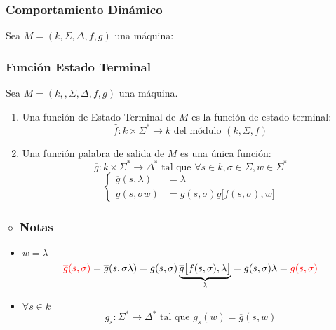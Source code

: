 \subsubsection{Comportamiento Dinámico}
Sea $M=(k,\Sigma,\Delta,f,g)$ una máquina: \\
\begin{center}
\end{center}
\subsubsection{Función Estado Terminal}
Sea $M=(k,,\Sigma,\Delta,f,g)$ una máquina.
\begin{enumerate}
\item Una función de Estado Terminal de $M$ es la función de estado terminal:
$$
\widehat{f}: k\times\Sigma^* \rightarrow k \text{ del módulo } (k,\Sigma,f)
$$
\item Una función palabra de salida de $M$ es una única función:
$$
\overline{g}:k\times\Sigma^*\rightarrow\Delta^* \text{ tal que }\forall s\in k,\sigma\in\Sigma, w\in\Sigma^*
$$
$$
\begin{cases}
\overline{g}(s,\lambda)&=\lambda \\
\overline{g}(s,\sigma w)&= g(s,\sigma)\overline{g} \big[ f(s,\sigma),w \big]
\end{cases}
$$
\end{enumerate}
\subsubsection{$\diamond$ Notas}
\begin{itemize}
\item $w=\lambda$
$$
{\color{red}\overline{g}(s,\sigma)}=
\overline{g}(s,\sigma\lambda)=
g(s,\sigma)\underbrace{\overline{g} \big[ f(s,\sigma),\lambda \big]}_{\lambda}=g(s,\sigma)\lambda =
{\color{red}g(s,\sigma)}
$$
\item $\forall s\in k$
$$
g_s:\Sigma^*\rightarrow\Delta^* \text{ tal que } g_s(w)=\overline{g}(s,w)
$$
\end{itemize}